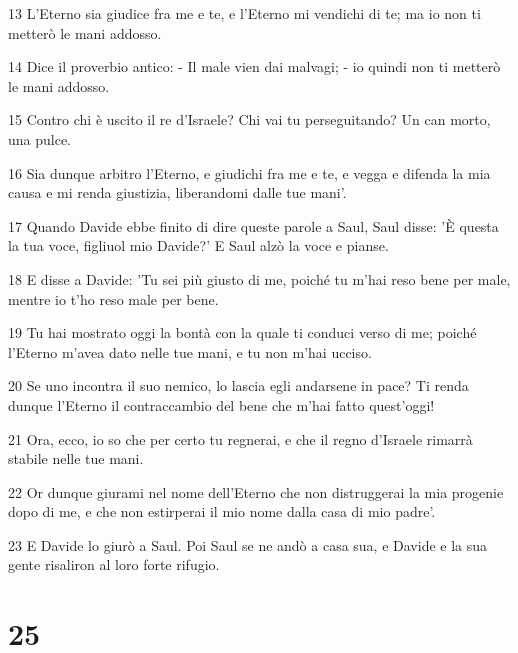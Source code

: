 \par 13 L'Eterno sia giudice fra me e te, e l'Eterno mi vendichi di te; ma io non ti metterò le mani addosso.
\par 14 Dice il proverbio antico: - Il male vien dai malvagi; - io quindi non ti metterò le mani addosso.
\par 15 Contro chi è uscito il re d'Israele? Chi vai tu perseguitando? Un can morto, una pulce.
\par 16 Sia dunque arbitro l'Eterno, e giudichi fra me e te, e vegga e difenda la mia causa e mi renda giustizia, liberandomi dalle tue mani'.
\par 17 Quando Davide ebbe finito di dire queste parole a Saul, Saul disse: 'È questa la tua voce, figliuol mio Davide?' E Saul alzò la voce e pianse.
\par 18 E disse a Davide: 'Tu sei più giusto di me, poiché tu m'hai reso bene per male, mentre io t'ho reso male per bene.
\par 19 Tu hai mostrato oggi la bontà con la quale ti conduci verso di me; poiché l'Eterno m'avea dato nelle tue mani, e tu non m'hai ucciso.
\par 20 Se uno incontra il suo nemico, lo lascia egli andarsene in pace? Ti renda dunque l'Eterno il contraccambio del bene che m'hai fatto quest'oggi!
\par 21 Ora, ecco, io so che per certo tu regnerai, e che il regno d'Israele rimarrà stabile nelle tue mani.
\par 22 Or dunque giurami nel nome dell'Eterno che non distruggerai la mia progenie dopo di me, e che non estirperai il mio nome dalla casa di mio padre'.
\par 23 E Davide lo giurò a Saul. Poi Saul se ne andò a casa sua, e Davide e la sua gente risaliron al loro forte rifugio.

\chapter{25}

